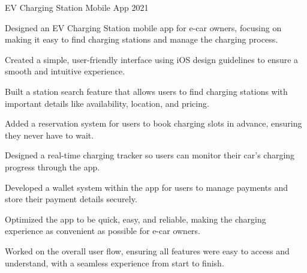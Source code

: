 \begin{cvprojects}
\cvproject
  {EV Charging Station Mobile App}
  {2021}
  {
    \begin{cvitems} %
      \item {Designed an EV Charging Station mobile app for e-car owners, focusing on making it easy to find charging stations and manage the charging process.}
      \item {Created a simple, user-friendly interface using iOS design guidelines to ensure a smooth and intuitive experience.}
      \item {Built a station search feature that allows users to find charging stations with important details like availability, location, and pricing.}
      \item {Added a reservation system for users to book charging slots in advance, ensuring they never have to wait.}
      \item {Designed a real-time charging tracker so users can monitor their car’s charging progress through the app.}
      \item {Developed a wallet system within the app for users to manage payments and store their payment details securely.}
      \item {Optimized the app to be quick, easy, and reliable, making the charging experience as convenient as possible for e-car owners.}
      \item {Worked on the overall user flow, ensuring all features were easy to access and understand, with a seamless experience from start to finish.}
    \end{cvitems}
  }%

\end{cvprojects}

